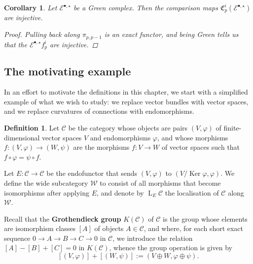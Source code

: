 \documentclass[11pt,fleqn]{article}
\theoremstyle{plain}
\newtheorem{corollary}[theorem]{Corollary}
\theoremstyle{definition}
\newtheorem{definition}[theorem]{Definition}
\theoremstyle{remark}
\numberwithin{equation}{theorem}
\newcommand{\anotherbullet}{\star}
\newcommand{\define}[1]{\textbf{#1}}
\newcommand{\comparison}[1]{\mathfrak{C}_{#1}}
\DeclareMathOperator{\Ker}{Ker}
\DeclareMathOperator{\LL}{L}
\begin{document}
        \begin{corollary}\label{corollary:Green-has-injective-comparisons}
            Let $\mathcal{E}^{\bullet,\anotherbullet}$ be a Gre{}en complex.
            Then the comparison maps $\comparison{p}^i(\mathcal{E}^{\bullet,\anotherbullet})$ are injective.

            \begin{proof}
                Pulling back along $\pi_{p,p-1}$ is an exact functor, and being Gre{}en tells us that the $\mathcal{E}^{\bullet,\anotherbullet} f_p^i$ are injective.
            \end{proof}
        \end{corollary}


    \subsection{The motivating example}\label{subsection:the-motivating-example}

        In an effort to motivate the definitions in this chapter, we start with a simplified example of what we wish to study: we replace vector bundles with vector spaces, and we replace curvatures of connections with endomorphisms.

        \begin{definition}
            Let $\mathcal{C}$ be the category whose objects are pairs $(V,\varphi)$ of finite-dimensional vector spaces $V$ and endomorphisms $\varphi$, and whose morphisms $f\colon(V,\varphi)\to(W,\psi)$ are the morphisms $f\colon V\to W$ of vector spaces such that $f\circ\varphi=\psi\circ f$.

            Let $E\colon\mathcal{C}\to\mathcal{C}$ be the endofunctor that sends $(V,\varphi)$ to $(V/\Ker\varphi,\varphi)$.
            We define the wide subcategory $\mathcal{W}$ to consist of all morphisms that become isomorphisms after applying $E$, and denote by $\LL_E\mathcal{C}$ the localisation of $\mathcal{C}$ along $\mathcal{W}$.
        \end{definition}

        Recall that the \define{Grothendieck group} $K(\mathcal{C})$ of $\mathcal{C}$ is the group whose elements are isomorphism classes $[A]$ of objects $A\in\mathcal{C}$, and where, for each short exact sequence $0\to A\to B\to C\to 0$ in $\mathcal{C}$, we introduce the relation $[A]-[B]+[C]=0$ in $K(\mathcal{C})$, whence the group operation is given by
        \[
            [(V,\varphi)] + [(W,\psi)]
            :=
            (V\oplus W,\varphi\oplus\psi).
        \]
\end{document}
